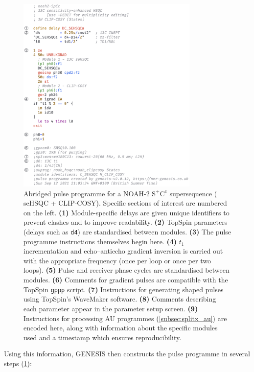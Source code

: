 \documentclass[a4paper,11pt]{article}
\newcommand{\carbon}{\ch{^{13}C}}
\begin{document}
\begin{refsection}
\begin{figure}
    \centering
    \includegraphics[width=0.8\textwidth]{pulprog_code.png}
    \caption{
        Abridged pulse programme for a NOAH-2 \(\mathrm{S^+C^c}\) supersequence (\carbon{} seHSQC + CLIP-COSY).
        Specific sections of interest are numbered on the left.
        \textbf{(1)} Module-specific delays are given unique identifiers to prevent clashes and to improve readability.
        \textbf{(2)} TopSpin parameters (delays such as \texttt{d4}) are standardised between modules.
        \textbf{(3)} The pulse programme instructions themselves begin here.
        \textbf{(4)} \(t_1\) incrementation and echo--antiecho gradient inversion is carried out with the appropriate frequency (once per loop or once per two loops).
        \textbf{(5)} Pulse and receiver phase cycles are standardised between modules.
        \textbf{(6)} Comments for gradient pulses are compatible with the TopSpin \texttt{gppp} script.
        \textbf{(7)} Instructions for generating shaped pulses using TopSpin's WaveMaker software.
        \textbf{(8)} Comments describing each parameter appear in the parameter setup screen.
        \textbf{(9)} Instructions for processing AU programmes (\cref{subsec:splitx_au}) are encoded here, along with information about the specific modules used and a timestamp which ensures reproducibility.
    }
    \label{fig:pulprog_code}
\end{figure}

Using this information, GENESIS then constructs the pulse programme in several steps (\cref{fig:pulprog_code}):


\end{refsection}
\end{document}
